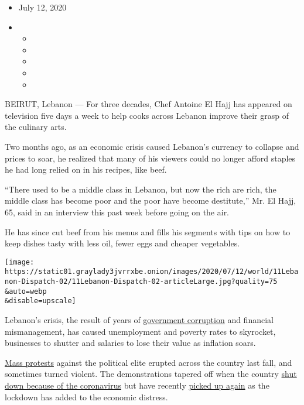 \begin{itemize}
\item
  July 12, 2020
\item
  \begin{itemize}
  \item
  \item
  \item
  \item
  \item
  \end{itemize}
\end{itemize}

BEIRUT, Lebanon --- For three decades, Chef Antoine El Hajj has appeared
on television five days a week to help cooks across Lebanon improve
their grasp of the culinary arts.

Two months ago, as an economic crisis caused Lebanon's currency to
collapse and prices to soar, he realized that many of his viewers could
no longer afford staples he had long relied on in his recipes, like
beef.

``There used to be a middle class in Lebanon, but now the rich are rich,
the middle class has become poor and the poor have become destitute,''
Mr. El Hajj, 65, said in an interview this past week before going on the
air.

He has since cut beef from his menus and fills his segments with tips on
how to keep dishes tasty with less oil, fewer eggs and cheaper
vegetables.

\texttt{[image: https://static01.graylady3jvrrxbe.onion/images/2020/07/12/world/11Lebanon-Dispatch-02/11Lebanon-Dispatch-02-articleLarge.jpg?quality=75\\\&auto=webp\\\&disable=upscale]}

Lebanon's crisis, the result of years of
\href{https://www.nytimes3xbfgragh.onion/2019/12/03/world/middleeast/lebanon-protests-corruption.html}{government
corruption} and financial mismanagement, has caused unemployment and
poverty rates to skyrocket, businesses to shutter and salaries to lose
their value as inflation soars.

\href{https://www.nytimes3xbfgragh.onion/2019/11/15/world/middleeast/lebanon-protests-economy.html}{Mass
protests} against the political elite erupted across the country last
fall, and sometimes turned violent. The demonstrations tapered off when
the country
\href{https://www.nytimes3xbfgragh.onion/2020/05/03/world/middleeast/beirut-lebanon-nightlife-coronavirus.html}{shut
down because of the coronavirus} but have recently
\href{https://www.nytimes3xbfgragh.onion/2020/06/11/world/middleeast/lebanon-protests.html}{picked
up again} as the lockdown has added to the economic distress.

